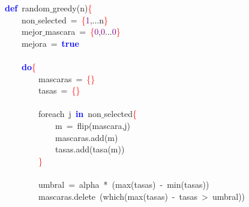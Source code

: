 \noindent
\mbox{}\textbf{\textcolor{Blue}{def}}\ random$\_$greedy\textcolor{BrickRed}{(}n\textcolor{BrickRed}{)}\textcolor{Red}{\{} \\
\mbox{}\ \ \ \ non$\_$selected\ \textcolor{BrickRed}{=}\ \textcolor{Red}{\{}\textcolor{Purple}{1}\textcolor{BrickRed}{,...}n\textcolor{Red}{\}} \\
\mbox{}\ \ \ \ mejor$\_$mascara\ \textcolor{BrickRed}{=}\ \textcolor{Red}{\{}\textcolor{Purple}{0}\textcolor{BrickRed}{,}\textcolor{Purple}{0}\textcolor{BrickRed}{...}\textcolor{Purple}{0}\textcolor{Red}{\}} \\
\mbox{}\ \ \ \ mejora\ \textcolor{BrickRed}{=}\ \textbf{\textcolor{Blue}{true}} \\
\mbox{} \\
\mbox{}\ \ \ \ \textbf{\textcolor{Blue}{do}}\textcolor{Red}{\{} \\
\mbox{}\ \ \ \ \ \ \ \ mascaras\ \textcolor{BrickRed}{=}\ \textcolor{Red}{\{\}} \\
\mbox{}\ \ \ \ \ \ \ \ tasas\ \textcolor{BrickRed}{=}\ \textcolor{Red}{\{\}} \\
\mbox{} \\
\mbox{}\ \ \ \ \ \ \ \ foreach\ j\ \textbf{\textcolor{Blue}{in}}\ non$\_$selected\textcolor{Red}{\{} \\
\mbox{}\ \ \ \ \ \ \ \ \ \ \ \ m\ \textcolor{BrickRed}{=}\ flip\textcolor{BrickRed}{(}mascara\textcolor{BrickRed}{,}j\textcolor{BrickRed}{)} \\
\mbox{}\ \ \ \ \ \ \ \ \ \ \ \ mascaras\textcolor{BrickRed}{.}add\textcolor{BrickRed}{(}m\textcolor{BrickRed}{)} \\
\mbox{}\ \ \ \ \ \ \ \ \ \ \ \ tasas\textcolor{BrickRed}{.}add\textcolor{BrickRed}{(}tasa\textcolor{BrickRed}{(}m\textcolor{BrickRed}{))} \\
\mbox{}\ \ \ \ \ \ \ \ \textcolor{Red}{\}} \\
\mbox{} \\
\mbox{}\ \ \ \ \ \ \ \ umbral\ \textcolor{BrickRed}{=}\ alpha\ \textcolor{BrickRed}{*}\ \textcolor{BrickRed}{(}max\textcolor{BrickRed}{(}tasas\textcolor{BrickRed}{)}\ \textcolor{BrickRed}{-}\ min\textcolor{BrickRed}{(}tasas\textcolor{BrickRed}{))} \\
\mbox{}\ \ \ \ \ \ \ \ mascaras\textcolor{BrickRed}{.}delete\ \textcolor{BrickRed}{(}which\textcolor{BrickRed}{(}max\textcolor{BrickRed}{(}tasas\textcolor{BrickRed}{)}\ \textcolor{BrickRed}{-}\ tasas\ \textcolor{BrickRed}{\textgreater{}}\ umbral\textcolor{BrickRed}{))} \\
